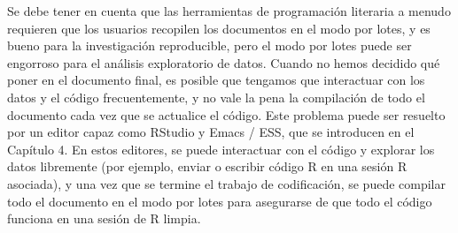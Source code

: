 \documentclass[conference]{IEEEtran}
\begin{document}
Se debe tener en cuenta que las herramientas de programación literaria a menudo requieren que los usuarios recopilen los documentos en el modo por lotes, y es bueno para la investigación reproducible, pero el modo por lotes puede ser engorroso para el análisis exploratorio de datos. Cuando no hemos decidido qué poner en el documento final, es posible que tengamos que interactuar con los datos y el código frecuentemente, y no vale la pena la compilación de todo el documento cada vez que se actualice el código. Este problema puede ser resuelto por un editor capaz como RStudio y Emacs / ESS, que se introducen en el Capítulo 4. En estos editores, se puede interactuar con el código y explorar los datos libremente (por ejemplo, enviar o escribir código R en una sesión R asociada), y una vez que se termine el trabajo de codificación, se puede compilar todo el documento en el modo por lotes para asegurarse de que todo el código funciona en una sesión de R limpia.
\end{document}
